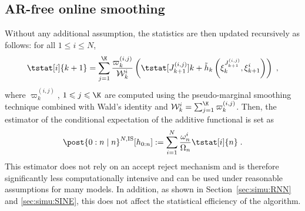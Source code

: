 \documentclass{article}
\newcommand{\af}[1]{h_{#1}}
\newcommand{\addf}[1]{\termletter_{#1}}
\newcommand{\termletter}{\tilde{h}}
\newcommand{\N}{N}
\newcommand{\hkup}{\bar{\varepsilon}}
\newcommand{\bi}[3]{J_{#1}^{(#2, #3)}}
\newcommand{\eqdef}{\ensuremath{:=}}
\newcommand{\eqsp}{\;}
\newcommand{\ewght}[2]{\ensuremath{\omega_{#1}^{#2}}}
\newcommand{\epart}[2]{\ensuremath{\xi_{#1}^{#2}}}
\newcommand{\sumwght}[2][]{%
\ifthenelse{\equal{#1}{}}{\ensuremath{\Omega_{#2}}}{\ensuremath{\Omega_{#2}^{(#1)}}}}
\newcommand{\kernelmarg}{\mathbf{R}}
\newcommand{\hatqg}[1]{\mathsf{\ell}_{#1}}
\begin{document}
\subsection{AR-free online smoothing}
Without any additional assumption, the statistics are then updated recursively as follows: for all $1\leqslant i\leqslant \N$,
\begin{equation}
\label{eq:update:paris:marginal:is}
\tstat[i]{k+1} =\sum_{j=1}^{\K}\frac{\varpi_k^{(i,j)}}{\mathcal{W}_k^i}\left( \tstat[\bi{k+1}{i}{j}]{k} + \addf{k}\left(\epart{k}{\bi{k+1}{i}{j}}, \epart{k+1}{i}\right)\right)\eqsp,
\end{equation}
where $\varpi_k^{(i,j)}$, $1\leqslant j \leqslant \K$ are computed using the pseudo-marginal smoothing technique combined with Wald's identity and $\mathcal{W}_k^i = \sum_{j=1}^{\K} \varpi_k^{(i,j)}$.
Then, the estimator of the conditional expectation of the additive functional is set as
\[
\post{0:n\mid n}^{\N,\textrm{IS}} [\af{0:n}] \eqdef \sum_{i=1}^{\N}\frac{\ewght{n}{i}}{\sumwght{n}}\tstat[i]{n}\eqsp.
\]
This estimator does not rely on an accept reject mechanism and is therefore significantly less computationally intensive and can be used under reasonable assumptions for many models. 
In addition, as shown in Section~\ref{sec:simu:RNN} and \ref{sec:simu:SINE}, this does not affect the statistical efficiency of the algorithm.
\end{document}
